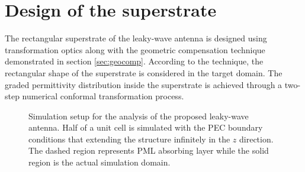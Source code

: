 


\section{Design of the superstrate} \label{sec:design}
The rectangular superstrate of the leaky-wave antenna is designed using transformation optics along with the geometric compensation technique demonstrated in section \ref{sec:geocomp}. According to the technique, the rectangular shape of the superstrate is considered in the target domain. The graded permittivity distribution inside the superstrate is achieved through a two-step numerical conformal transformation process. 

\begin{figure} [t!]
\centering
  \noindent
\hspace*{1.5cm}
\mbox{}
  \hspace*{1.5cm}%
    \mbox{}
 \hspace*{2cm}%
 

  \caption[Simulation setup for the analysis of the proposed leaky-wave antenna.]{Simulation setup for the analysis of the proposed leaky-wave antenna. Half of a unit cell is simulated with the PEC boundary conditions that extending the structure infinitely in the $z$ direction. The dashed region represents PML absorbing layer while the solid region is the actual simulation domain.}
\label{fig:simdomain2}
\end{figure}

